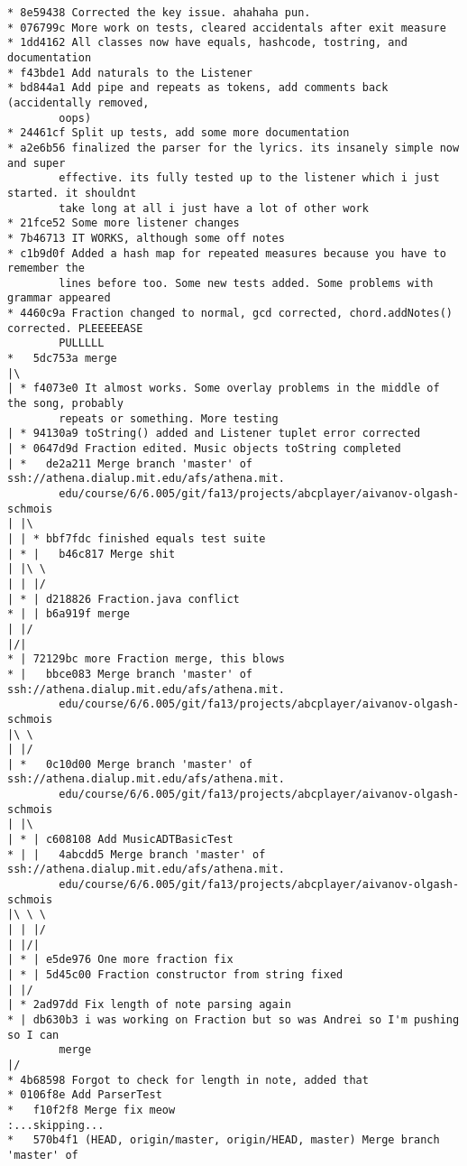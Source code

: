 \documentclass[12pt]{book}
\begin{document}
\begin{Verbatim}
* 8e59438 Corrected the key issue. ahahaha pun.
* 076799c More work on tests, cleared accidentals after exit measure
* 1dd4162 All classes now have equals, hashcode, tostring, and documentation
* f43bde1 Add naturals to the Listener
* bd844a1 Add pipe and repeats as tokens, add comments back (accidentally removed, 
        oops)
* 24461cf Split up tests, add some more documentation
* a2e6b56 finalized the parser for the lyrics. its insanely simple now and super 
        effective. its fully tested up to the listener which i just started. it shouldnt 
        take long at all i just have a lot of other work
* 21fce52 Some more listener changes
* 7b46713 IT WORKS, although some off notes
* c1b9d0f Added a hash map for repeated measures because you have to remember the 
        lines before too. Some new tests added. Some problems with grammar appeared
* 4460c9a Fraction changed to normal, gcd corrected, chord.addNotes() corrected. PLEEEEEASE 
        PULLLLL
*   5dc753a merge
|\
| * f4073e0 It almost works. Some overlay problems in the middle of the song, probably 
        repeats or something. More testing
| * 94130a9 toString() added and Listener tuplet error corrected
| * 0647d9d Fraction edited. Music objects toString completed
| *   de2a211 Merge branch 'master' of ssh://athena.dialup.mit.edu/afs/athena.mit.
        edu/course/6/6.005/git/fa13/projects/abcplayer/aivanov-olgash-schmois
| |\
| | * bbf7fdc finished equals test suite
| * |   b46c817 Merge shit
| |\ \
| | |/
| * | d218826 Fraction.java conflict
* | | b6a919f merge
| |/
|/|
* | 72129bc more Fraction merge, this blows
* |   bbce083 Merge branch 'master' of ssh://athena.dialup.mit.edu/afs/athena.mit.
        edu/course/6/6.005/git/fa13/projects/abcplayer/aivanov-olgash-schmois
|\ \
| |/
| *   0c10d00 Merge branch 'master' of ssh://athena.dialup.mit.edu/afs/athena.mit.
        edu/course/6/6.005/git/fa13/projects/abcplayer/aivanov-olgash-schmois
| |\
| * | c608108 Add MusicADTBasicTest
* | |   4abcdd5 Merge branch 'master' of ssh://athena.dialup.mit.edu/afs/athena.mit.
        edu/course/6/6.005/git/fa13/projects/abcplayer/aivanov-olgash-schmois
|\ \ \
| | |/
| |/|
| * | e5de976 One more fraction fix
| * | 5d45c00 Fraction constructor from string fixed
| |/
| * 2ad97dd Fix length of note parsing again
* | db630b3 i was working on Fraction but so was Andrei so I'm pushing so I can 
        merge
|/
* 4b68598 Forgot to check for length in note, added that
* 0106f8e Add ParserTest
*   f10f2f8 Merge fix meow
:...skipping...
*   570b4f1 (HEAD, origin/master, origin/HEAD, master) Merge branch 'master' of 

\end{Verbatim}
\end{document}
